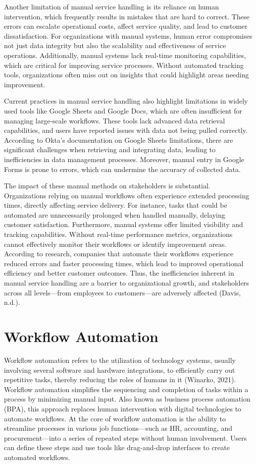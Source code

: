 Another limitation of manual service handling is its reliance on human intervention, which frequently results in mistakes that are hard to correct. These errors can escalate operational costs, affect service quality, and lead to customer dissatisfaction. For organizations with manual systems, human error compromises not just data integrity but also the scalability and effectiveness of service operations. Additionally, manual systems lack real-time monitoring capabilities, which are critical for improving service processes. Without automated tracking tools, organizations often miss out on insights that could highlight areas needing improvement.

Current practices in manual service handling also highlight limitations in widely used tools like Google Sheets and Google Docs, which are often insufficient for managing large-scale workflows. These tools lack advanced data retrieval capabilities, and users have reported issues with data not being pulled correctly. According to Okta’s documentation on Google Sheets limitations, there are significant challenges when retrieving and integrating data, leading to inefficiencies in data management processes. Moreover, manual entry in Google Forms is prone to errors, which can undermine the accuracy of collected data.

The impact of these manual methods on stakeholders is substantial. Organizations relying on manual workflows often experience extended processing times, directly affecting service delivery. For instance, tasks that could be automated are unnecessarily prolonged when handled manually, delaying customer satisfaction. Furthermore, manual systems offer limited visibility and tracking capabilities. Without real-time performance metrics, organizations cannot effectively monitor their workflows or identify improvement areas. According to research, companies that automate their workflows experience reduced errors and faster processing times, which lead to improved operational efficiency and better customer outcomes. Thus, the inefficiencies inherent in manual service handling are a barrier to organizational growth, and stakeholders across all levels—from employees to customers—are adversely affected (Davis, n.d.).

\section{Workflow Automation}

Workflow automation refers to the utilization of technology systems, usually involving several software and hardware integrations, to efficiently carry out repetitive tasks, thereby reducing the roles of humans in it (Winarko, 2021). Workflow automation simplifies the sequencing and completion of tasks within a process by minimizing manual input. Also known as business process automation (BPA), this approach replaces human intervention with digital technologies to automate workflows. At the core of workflow automation is the ability to streamline processes in various job functions—such as HR, accounting, and procurement—into a series of repeated steps without human involvement. Users can define these steps and use tools like drag-and-drop interfaces to create automated workflows. 

